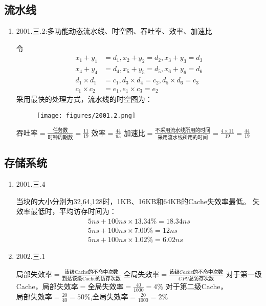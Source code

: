 \documentclass[a4paper]{ctexart}
\begin{document}
\subsection{流水线}
\begin{enumerate}
  \item 2001.三.2:多功能动态流水线、时空图、吞吐率、效率、加速比
  
  令
  \begin{align*}
    x_1+y_1&=d_1,x_2+y_2=d_2,x_3+y_3=d_3\\
    x_4+y_4&=d_4,x_5+y_5=d_5,x_6+y_6=d_6\\
    d_1\times d_1&=c_1,d_3\times d_4=c_2,d_5\times d_6=c_3\\
    c_1\times c_2&=e_1,e_1\times c_3=e_2
  \end{align*}
  采用最快的处理方式，流水线的时空图为：
  \begin{figure}[htbp]
    \centering
    \texttt{[image: figures/2001.2.png]}
  \end{figure}
  
  $\text{吞吐率}=\frac{\text{任务数}}{\text{时钟周期数}}=\frac{11}{19}$\newline
  $\text{效率}=\frac{44}{95}$\newline
  $\text{加速比}=\frac{\text{不采用流水线所用的时间}}{\text{采用流水线所用的时间}}=\frac{4\times 11}{19}=\frac{44}{19}$
\end{enumerate}
\subsection{存储系统}
\begin{enumerate}
  \item 2001.三.4
  
  当块的大小分别为32,64,128时，1KB、16KB和64KB的Cache失效率最低。
  失效率最低时，平均访存时间为：
  \begin{align*}
    5ns+100ns\times 13.34\%=18.34ns\\
    5ns+100ns\times 7.00\% = 12ns \\
    5ns+100ns\times 1.02\%=6.02ns
  \end{align*}
  
  \item 2002.三.1
  
  $\text{局部失效率}=\frac{\text{该级Cache的不命中次数}}{\text{到达该级Cache的访存次数}}$\newline
  $\text{全局失效率}=\frac{该级Cache的不命中次数}{CPU总访存次数}$\newline
  对于第一级Cache，$\text{局部失效率}=\text{全局失效率}=\frac{40}{1000}=4\%$\newline
  对于第二级Cache，$\text{局部失效率}=\frac{20}{40}=50\%$,$\text{全局失效率}=\frac{20}{1000}=2\%$
  
\end{enumerate}
\end{document}
